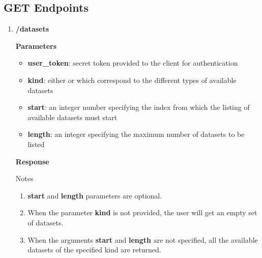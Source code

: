 \documentclass[a4paper,10pt]{scrartcl}
\begin{document}
\subsection{GET Endpoints}
\begin{enumerate}
 \item \textbf{/datasets}
\textbf{Parameters}
\begin{itemize}
\item \textbf{user\_token}: secret token provided to the client for authentication
\item \textbf{kind}: either  or  which correspond to the different types of available datasets
\item \textbf{start}: an integer number specifying the index from which the listing of available datasets must start 
\item \textbf{length}: an integer specifying the maximum number of datasets to be listed
\end{itemize}
\textbf{Response}
\textsf{Notes}
\begin{enumerate}
 \item \textbf{start} and \textbf{length} parameters are optional. 
 \item When the parameter \textbf{kind} is not provided, the user will get an empty 
 set of datasets. 
 \item When the arguments \textbf{start} and \textbf{length} 
 are not specified, all the available datasets of the specified kind are returned.
\end{enumerate}


\end{enumerate}
\end{document}

